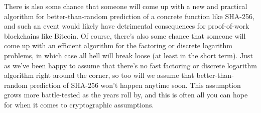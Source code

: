 There is also some chance that someone will come up with a new and practical algorithm
for better-than-random prediction of a concrete function like SHA-256, and such an event
would likely have detrimental consequences for proof-of-work blockchains like Bitcoin. Of
course, there’s also some chance that someone will come up with an efficient algorithm for
the factoring or discrete logarithm problems, in which case all hell will break loose (at least
in the short term). Just as we've been happy to assume that there’s no fast factoring or
discrete logarithm algorithm right around the corner, so too will we assume that better-than-random prediction of SHA-256 won’t happen anytime soon. This assumption grows more
battle-tested as the years roll by, and this is often all you can hope for when it comes to
cryptographic assumptions.\\

